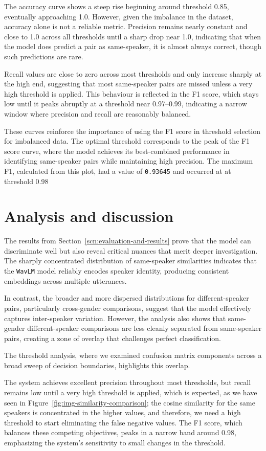 \documentclass[conference]{IEEEtran}
\begin{document}
The accuracy curve shows a steep rise beginning around threshold 0.85, eventually approaching 1.0. However, given the imbalance in the dataset, accuracy alone is not a reliable metric. Precision remains nearly constant and close to 1.0 across all thresholds until a sharp drop near 1.0, indicating that when the model does predict a pair as same-speaker, it is almost always correct, though such predictions are rare.

Recall values are close to zero across most thresholds and only increase sharply at the high end, suggesting that most same-speaker pairs are missed unless a very high threshold is applied. This behaviour is reflected in the F1 score, which stays low until it peaks abruptly at a threshold near 0.97–0.99, indicating a narrow window where precision and recall are reasonably balanced.

These curves reinforce the importance of using the F1 score in threshold selection for imbalanced data. The optimal threshold corresponds to the peak of the F1 score curve, where the model achieves its best-combined performance in identifying same-speaker pairs while maintaining high precision. The maximum F1, calculated from this plot, had a value of \texttt{0.93645} and occurred at at threshold 0.98


\section{Analysis and discussion}


The results from Section~\ref{scn:evaluation-and-results} prove that the model can discriminate well but also reveal critical nuances that merit deeper investigation. The sharply concentrated distribution of same-speaker similarities indicates that the \texttt{WavLM} model reliably encodes speaker identity, producing consistent embeddings across multiple utterances.

In contrast, the broader and more dispersed distributions for different-speaker pairs, particularly cross-gender comparisons, suggest that the model effectively captures inter-speaker variation. However, the analysis also shows that same-gender different-speaker comparisons are less cleanly separated from same-speaker pairs, creating a zone of overlap that challenges perfect classification.

The threshold analysis, where we examined confusion matrix components across a broad sweep of decision boundaries, highlights this overlap. 


The system achieves excellent precision throughout most thresholds, but recall remains low until a very high threshold is applied, which is expected, as we have seen in Figure~\ref{fig:img-similarity-comparison}; the cosine similarity for the same speakers is concentrated in the higher values, and therefore, we need a high threshold to start eliminating the false negative values. The F1 score, which balances these competing objectives, peaks in a narrow band around 0.98, emphasizing the system's sensitivity to small changes in the threshold.
\end{document}
